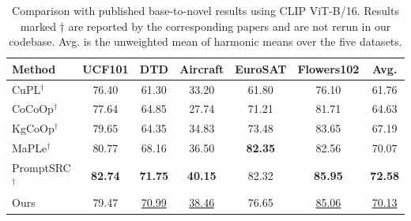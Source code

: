 \begin{table}[t]
\centering
\caption{Comparison with published base-to-novel results using CLIP ViT-B/16. Results marked $\dagger$ are reported by the corresponding papers and are not rerun in our codebase. Avg. is the unweighted mean of harmonic means over the five datasets.}
\label{tab:published_comparison}
\begin{tabular}{lcccccc}
\toprule
Method & UCF101 & DTD & Aircraft & EuroSAT & Flowers102 & Avg. \\
\midrule
CuPL$^{\dagger}$ & 76.40 & 61.30 & 33.20 & 61.80 & 76.10 & 61.76 \\
CoCoOp$^{\dagger}$ & 77.64 & 64.85 & 27.74 & 71.21 & 81.71 & 64.63 \\
KgCoOp$^{\dagger}$ & 79.65 & 64.35 & 34.83 & 73.48 & 83.65 & 67.19 \\
MaPLe$^{\dagger}$ & 80.77 & 68.16 & 36.50 & \textbf{82.35} & 82.56 & 70.07 \\
PromptSRC$^{\dagger}$ & \textbf{82.74} & \textbf{71.75} & \textbf{40.15} & 82.32 & \textbf{85.95} & \textbf{72.58} \\
Ours & 79.47 & \underline{70.99} & \underline{38.46} & 76.65 & \underline{85.06} & \underline{70.13} \\
\bottomrule
\end{tabular}
\end{table}
